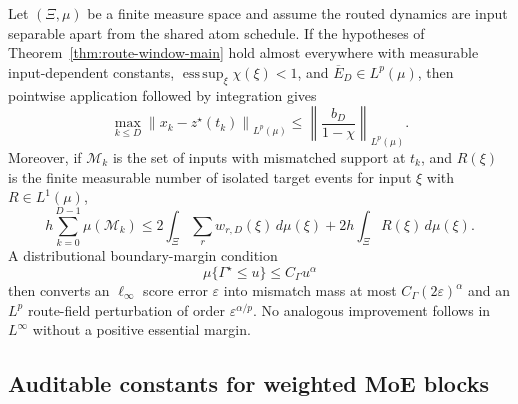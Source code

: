 \documentclass[twoside,11pt]{article}
\newcommand{\norm}[1]{\left\lVert #1\right\rVert}
\begin{document}
Let $(\Xi,\mu)$ be a finite measure space and assume the routed dynamics are input separable apart from the shared atom schedule.  If the hypotheses of Theorem~\ref{thm:route-window-main} hold almost everywhere with measurable input-dependent constants, $\operatorname*{ess\,sup}_\xi\chi(\xi)<1$, and $\overline E_D\in L^p(\mu)$, then pointwise application followed by integration gives
\begin{equation}
 \max_{k\le D}
 \norm{x_k-z^\star(t_k)}_{L^p(\mu)}
 \le\left\|\frac{b_D}{1-\chi}\right\|_{L^p(\mu)}.
 \label{eq:routing-lp-state-main}
\end{equation}
Moreover, if $\mathcal M_k$ is the set of inputs with mismatched support at $t_k$, and $R(\xi)$ is the finite measurable number of isolated target events for input $\xi$ with $R\in L^1(\mu)$,
\begin{equation}
 h\sum_{k=0}^{D-1}\mu(\mathcal M_k)
 \le2\int_\Xi\sum_r w_{r,D}(\xi)\,d\mu(\xi)
 +2h\int_\Xi R(\xi)\,d\mu(\xi).
 \label{eq:routing-lp-occupancy-main}
\end{equation}
A distributional boundary-margin condition
\begin{equation}
 \mu\{\Gamma^\star\le u\}\le C_\Gamma u^\alpha
 \label{eq:margin-density-main}
\end{equation}
then converts an $\ell_\infty$ score error $\varepsilon$ into mismatch mass at most $C_\Gamma(2\varepsilon)^\alpha$ and an $L^p$ route-field perturbation of order $\varepsilon^{\alpha/p}$.  No analogous improvement follows in $L^\infty$ without a positive essential margin.

\subsection{Auditable constants for weighted MoE blocks}
\label{sec:moe-constants-main}
\end{document}
